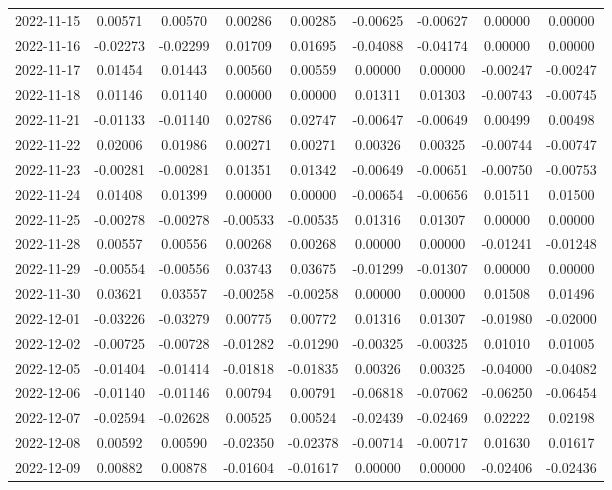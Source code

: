 \begin{footnotesize}
\begin{longtable}{lcccccccc}
2022-11-15 & 0.00571 & 0.00570 & 0.00286 & 0.00285 & -0.00625 & -0.00627 & 0.00000 & 0.00000 \\
2022-11-16 & -0.02273 & -0.02299 & 0.01709 & 0.01695 & -0.04088 & -0.04174 & 0.00000 & 0.00000 \\
2022-11-17 & 0.01454 & 0.01443 & 0.00560 & 0.00559 & 0.00000 & 0.00000 & -0.00247 & -0.00247 \\
2022-11-18 & 0.01146 & 0.01140 & 0.00000 & 0.00000 & 0.01311 & 0.01303 & -0.00743 & -0.00745 \\
2022-11-21 & -0.01133 & -0.01140 & 0.02786 & 0.02747 & -0.00647 & -0.00649 & 0.00499 & 0.00498 \\
2022-11-22 & 0.02006 & 0.01986 & 0.00271 & 0.00271 & 0.00326 & 0.00325 & -0.00744 & -0.00747 \\
2022-11-23 & -0.00281 & -0.00281 & 0.01351 & 0.01342 & -0.00649 & -0.00651 & -0.00750 & -0.00753 \\
2022-11-24 & 0.01408 & 0.01399 & 0.00000 & 0.00000 & -0.00654 & -0.00656 & 0.01511 & 0.01500 \\
2022-11-25 & -0.00278 & -0.00278 & -0.00533 & -0.00535 & 0.01316 & 0.01307 & 0.00000 & 0.00000 \\
2022-11-28 & 0.00557 & 0.00556 & 0.00268 & 0.00268 & 0.00000 & 0.00000 & -0.01241 & -0.01248 \\
2022-11-29 & -0.00554 & -0.00556 & 0.03743 & 0.03675 & -0.01299 & -0.01307 & 0.00000 & 0.00000 \\
2022-11-30 & 0.03621 & 0.03557 & -0.00258 & -0.00258 & 0.00000 & 0.00000 & 0.01508 & 0.01496 \\
2022-12-01 & -0.03226 & -0.03279 & 0.00775 & 0.00772 & 0.01316 & 0.01307 & -0.01980 & -0.02000 \\
2022-12-02 & -0.00725 & -0.00728 & -0.01282 & -0.01290 & -0.00325 & -0.00325 & 0.01010 & 0.01005 \\
2022-12-05 & -0.01404 & -0.01414 & -0.01818 & -0.01835 & 0.00326 & 0.00325 & -0.04000 & -0.04082 \\
2022-12-06 & -0.01140 & -0.01146 & 0.00794 & 0.00791 & -0.06818 & -0.07062 & -0.06250 & -0.06454 \\
2022-12-07 & -0.02594 & -0.02628 & 0.00525 & 0.00524 & -0.02439 & -0.02469 & 0.02222 & 0.02198 \\
2022-12-08 & 0.00592 & 0.00590 & -0.02350 & -0.02378 & -0.00714 & -0.00717 & 0.01630 & 0.01617 \\
2022-12-09 & 0.00882 & 0.00878 & -0.01604 & -0.01617 & 0.00000 & 0.00000 & -0.02406 & -0.02436 \\

\end{longtable}
\end{footnotesize}
